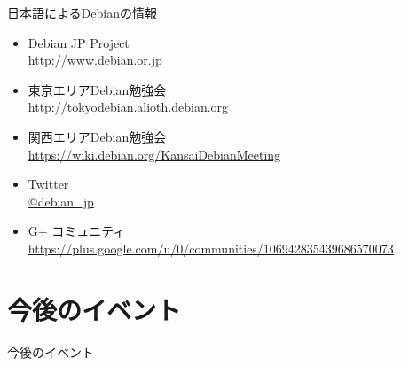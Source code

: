 \begin{frame}{日本語によるDebianの情報}
\begin{itemize}
  \item Debian JP Project \\
      \url{http://www.debian.or.jp}
  \item 東京エリアDebian勉強会\\
      \url{http://tokyodebian.alioth.debian.org}
  \item 関西エリアDebian勉強会 \\
      \url{https://wiki.debian.org/KansaiDebianMeeting}
  \item Twitter \\
      \url{@debian_jp}
  \item G+ コミュニティ \\
      \url{https://plus.google.com/u/0/communities/106942835439686570073}
 
\end{itemize}
\end{frame}

\section{今後のイベント}
\begin{frame}\begin{center}\Huge{今後のイベント}\end{center}\end{frame}

